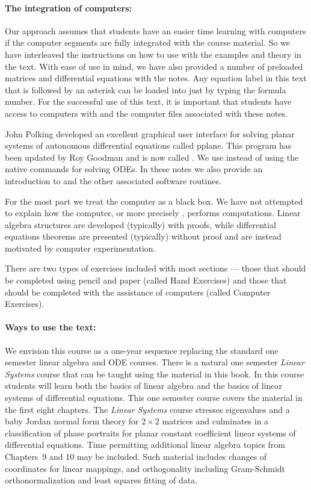 \documentclass{ximera}
\begin{document}
\paragraph{The integration of computers:}  Our approach assumes that students 
have an easier time learning with 
computers if the computer segments are fully integrated with the course 
material.  So we have interleaved the instructions on how to use \Matlab 
with the examples and theory in the text.  With ease of use in mind, we 
have also provided a number of preloaded matrices and differential equations 
with the notes.  Any equation label in this text that is followed by an 
asterisk can be loaded into \Matlab just by typing the formula number.  For 
the successful use of this text, it is important that students have access 
to computers with \Matlab and the computer files associated with these notes.

John Polking developed an excellent graphical user interface for solving
planar systems of autonomous differential equations called {\textsf{pplane}}.  
This program has been updated by Roy Goodman and is now called {\pplane}.
We use {\pplane} instead of using the \Matlab native commands for solving ODEs. 
In these notes we also provide an introduction to {\pplane} and the other 
associated software routines.

For the most part we treat the computer as a black box.  We have not
attempted to explain how the computer, or more precisely \Matlabp, 
performs computations.   Linear algebra structures are developed (typically) 
with proofs, while differential equations theorems are presented (typically) 
without proof and are instead motivated by computer experimentation.  

There are two types of exercises included with most sections --- those that 
should be completed using pencil and paper (called Hand Exercises) and 
those that should be completed with the assistance of computers (called 
Computer Exercises).  

\paragraph{Ways to use the text:}  We envision this course as a one-year 
sequence replacing the standard one semester linear algebra and ODE courses. 
There is a natural one semester {\em Linear Systems\/} course that can be 
taught using the material in this book. In this course students will
learn both the basics of linear algebra and the basics of linear systems of
differential equations.  This one semester course covers the material in the 
first eight chapters.  The {\em Linear Systems\/} course stresses eigenvalues 
and a baby Jordan normal form theory for $2\times 2$ matrices and culminates 
in a classification of phase portraits for planar constant coefficient linear 
systems of differential equations.   Time permitting additional linear 
algebra topics from Chapters~9 and 10 may be included.  Such material 
includes changes of coordinates for linear mappings, and orthogonality 
including Gram-Schmidt orthonormalization and least squares fitting of data.
\end{document}
